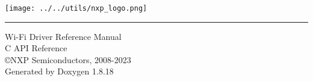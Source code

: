 \let\mypdfximage\pdfximage\def\pdfximage{\immediate\mypdfximage}\documentclass[twoside]{book}
\newcommand{\+}{\discretionary{\mbox{\scriptsize$\hookleftarrow$}}{}{}}
\newcommand{\clearemptydoublepage}{%
  \newpage{\pagestyle{empty}\cleardoublepage}%
}
\newcommand{\TitleHRule}{\rule{\linewidth}{10pt}}
\begin{document}
\hypersetup{pageanchor=false,%
            bookmarksnumbered=true,%
            pdfencoding=unicode%
            }
\SetWatermarkFontSize{3cm}
\hypersetup{pageanchor=false,citecolor=blue}
\begin{titlepage}
\begin{minipage}[t]{\textwidth}
\raggedright
\texttt{[image: ../../utils/nxp\_logo.png]}
\end{minipage}
\TitleHRule
\vspace{3.5cm}
\begin{flushleft}
{\Huge {\color{red}Wi-Fi Driver Reference Manual}}\\
\vspace*{1cm}
{\large C API Reference}\\
\vspace{4cm}
{\Large \copyright \space NXP Semiconductors, 2008-2023}\\
\vspace{1cm}
{\small Generated by Doxygen 1.8.18}\\
\end{flushleft}
\end{titlepage}
\clearemptydoublepage
{}
\tableofcontents
\clearemptydoublepage
{}
\hypersetup{pageanchor=true}

\end{document}

